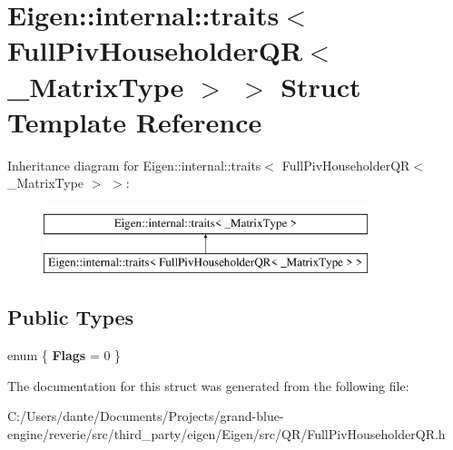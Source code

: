 \hypertarget{struct_eigen_1_1internal_1_1traits_3_01_full_piv_householder_q_r_3_01___matrix_type_01_4_01_4}{}\section{Eigen\+::internal\+::traits$<$ Full\+Piv\+Householder\+QR$<$ \+\_\+\+Matrix\+Type $>$ $>$ Struct Template Reference}
\label{struct_eigen_1_1internal_1_1traits_3_01_full_piv_householder_q_r_3_01___matrix_type_01_4_01_4}
Inheritance diagram for Eigen\+::internal\+::traits$<$ Full\+Piv\+Householder\+QR$<$ \+\_\+\+Matrix\+Type $>$ $>$\+:\begin{figure}[H]
\begin{center}
\leavevmode
\includegraphics[height=2.000000cm]{struct_eigen_1_1internal_1_1traits_3_01_full_piv_householder_q_r_3_01___matrix_type_01_4_01_4}
\end{center}
\end{figure}
\subsection*{Public Types}
\begin{DoxyCompactItemize}
\item 
\mbox{\label{struct_eigen_1_1internal_1_1traits_3_01_full_piv_householder_q_r_3_01___matrix_type_01_4_01_4_a23273774b7f5e6cd5460606dc0abf062}} 
enum \{ {\bfseries Flags} = 0
 \}
\end{DoxyCompactItemize}


The documentation for this struct was generated from the following file\+:\begin{DoxyCompactItemize}
\item 
C\+:/\+Users/dante/\+Documents/\+Projects/grand-\/blue-\/engine/reverie/src/third\+\_\+party/eigen/\+Eigen/src/\+Q\+R/Full\+Piv\+Householder\+Q\+R.\+h\end{DoxyCompactItemize}
